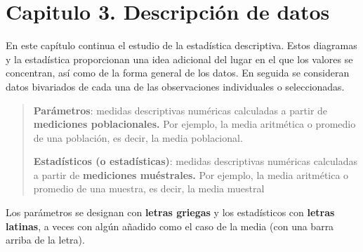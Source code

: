 \documentclass[]{article}
\begin{document}
\section{Capitulo 3. Descripción de datos}
En este capítulo continua el estudio de la estadística descriptiva. Estos diagramas y la estadística proporcionan una idea adicional del lugar en el que los valores se concentran, así como de la forma general de los datos. En seguida se consideran datos bivariados de cada una de las observaciones individuales o seleccionadas.
\begin{quote}
	\textbf{Parámetros}: medidas descriptivas numéricas calculadas a partir de \textbf{mediciones poblacionales.} Por ejemplo, la media aritmética o promedio de una población, es decir, la media poblacional.
	\item \textbf{Estadísticos (o estadísticas)}: medidas descriptivas numéricas calculadas a partir de \textbf{mediciones muéstrales.} Por ejemplo, la media aritmética o promedio de una muestra, es decir, la media muestral
\end{quote}
Los parámetros se designan con \textbf{letras griegas} y los estadísticos con \textbf{letras latinas}, a veces con algún añadido como el caso de la media (con una barra arriba de la letra).
\end{document}
